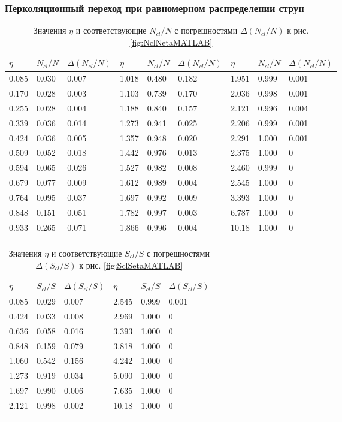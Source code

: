 \subsubsection{Перколяционный переход при равномерном распределении струн}
{\footnotesize
\begin{longtable}{| l | l | l || l | l | l || l | l | l |}
	\hline
	$\eta$	&	$N_{cl}/N$	&	$\Delta (N_{cl}/N)$	&	$\eta$	&	$N_{cl}/N$	&	$\Delta (N_{cl}/N)$	&	$\eta$	&	$N_{cl}/N$	&	$\Delta (N_{cl}/N)$	\\
	\hline
	0.085	&	0.030	&	0.007	&	1.018	&	0.480	&	0.182	&	1.951	&	0.999	&	0.001	\\
	0.170	&	0.028	&	0.003	&	1.103	&	0.739	&	0.170	&	2.036	&	0.998	&	0.001	\\
	0.255	&	0.028	&	0.004	&	1.188	&	0.840	&	0.157	&	2.121	&	0.996	&	0.004	\\
	0.339	&	0.036	&	0.014	&	1.273	&	0.941	&	0.025	&	2.206	&	0.999	&	0.001	\\
	0.424	&	0.036	&	0.005	&	1.357	&	0.948	&	0.020	&	2.291	&	1.000	&	0.001	\\
	0.509	&	0.052	&	0.018	&	1.442	&	0.976	&	0.013	&	2.375	&	1.000	&	0	\\
	0.594	&	0.065	&	0.026	&	1.527	&	0.982	&	0.008	&	2.460	&	0.999	&	0	\\
	0.679	&	0.077	&	0.009	&	1.612	&	0.989	&	0.004	&	2.545	&	1.000	&	0	\\
	0.764	&	0.095	&	0.037	&	1.697	&	0.992	&	0.009	&	3.393	&	1.000	&	0	\\
	0.848	&	0.151	&	0.051	&	1.782	&	0.997	&	0.003	&	6.787	&	1.000	&	0	\\
	0.933	&	0.265	&	0.071	&	1.866	&	0.996	&	0.004	&	10.18	&	1.000	&	0	\\
	\hline
	\caption{Значения $\eta$ и соответствующие $N_{cl}/N$ с погрешностями $\Delta (N_{cl}/N)$ к рис. \ref{fig:NclNetaMATLAB}} \label{tab:NclNetaMATLAB}
\end{longtable}}

{\footnotesize
\begin{longtable}{| l | l | l || l | l | l |}
	\hline
	$\eta$	&	$S_{cl}/S$	&	$\Delta (S_{cl}/S)$	&	$\eta$	&	$S_{cl}/S$	&	$\Delta (S_{cl}/S)$	\\
	\hline
	0.085	&	0.029	&	0.007	&	2.545	&	0.999	&	0.001	\\
	0.424	&	0.033	&	0.008	&	2.969	&	1.000	&	0	\\
	0.636	&	0.058	&	0.016	&	3.393	&	1.000	&	0	\\
	0.848	&	0.159	&	0.079	&	3.818	&	1.000	&	0	\\
	1.060	&	0.542	&	0.156	&	4.242	&	1.000	&	0	\\
	1.273	&	0.919	&	0.034	&	5.090	&	1.000	&	0	\\
	1.697	&	0.990	&	0.006	&	7.635	&	1.000	&	0	\\
	2.121	&	0.998	&	0.002	&	10.18	&	1.000	&	0	\\
	\hline
	\caption{Значения $\eta$ и соответствующие $S_{cl}/S$ с погрешностями $\Delta (S_{cl}/S)$ к рис. \ref{fig:SclSetaMATLAB}} \label{tab:SclSetaMATLAB}
\end{longtable}}

